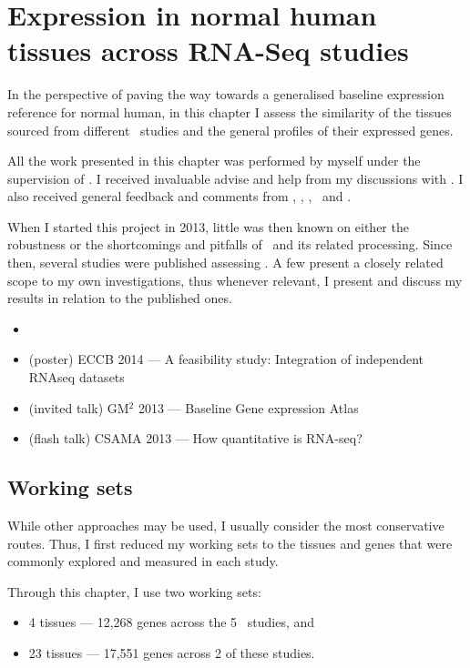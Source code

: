 \chapter{Expression in normal human tissues across RNA-Seq studies}
\label{ch:Transcriptomics}

In the perspective of paving the way towards
a generalised baseline expression reference for normal human,
in this chapter I assess the similarity
of the tissues sourced from different \Rnaseq\ studies and
the general profiles of their expressed genes.

All the work presented in this chapter was performed by myself under the
supervision of \alvis.
I received invaluable advise and help from my discussions with \nuno.
I also received general feedback and comments from \mar, \johan, \sarah, \gos\
and \wolfgang.

When I started this project in 2013,
little was then known on either the robustness or
the shortcomings and pitfalls of \Rnaseq\ and
its related processing.
Since then, several studies were published assessing \Rnaseq.
A few present a closely related scope to my own investigations, thus
whenever relevant,
I present and discuss my results in relation to the published ones.


\derivativeWork{}
\begin{itemize}[topsep=0pt,nosep]
    \item {}
    \item (poster) ECCB 2014 --- A feasibility study:
        Integration of independent RNAseq datasets
    \item (invited talk) GM$^2$ 2013 --- Baseline Gene expression Atlas
    \item (flash talk) CSAMA 2013 --- How quantitative is RNA-seq?
\end{itemize}

\clearpage

\section{Working sets}

While other approaches may be used,
I usually consider the most conservative routes.
Thus, I first reduced my working sets to the tissues and genes that were
commonly explored and measured in each study.

Through this chapter, I use two working sets:
\begin{itemize}[topsep=0pt,nosep]
    \item 4 tissues --- 12,268 genes across the 5 \Rnaseq\ studies, and
    \item 23 tissues --- 17,551 genes across 2 of these studies.
\end{itemize}

